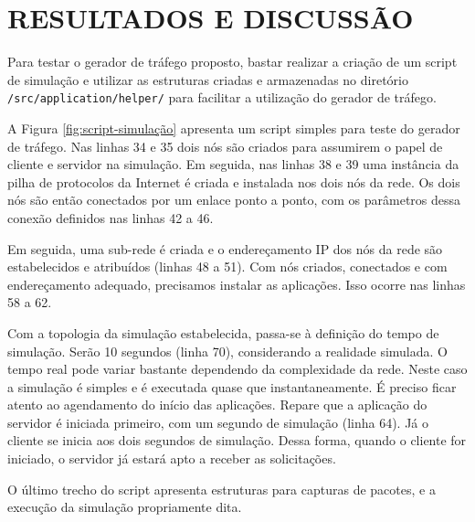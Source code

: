 \section{RESULTADOS E DISCUSSÃO}
Para testar o gerador de tráfego proposto, bastar realizar a criação de um script de simulação e utilizar as estruturas criadas e armazenadas no diretório \verb|/src/application/helper/| para facilitar a utilização do gerador de tráfego.

A Figura \ref{fig:script-simulação} apresenta um script simples para teste do gerador de tráfego. Nas linhas 34 e 35 dois nós são criados para assumirem o papel de cliente e servidor na simulação. Em seguida, nas linhas 38 e 39 uma instância da pilha de protocolos da Internet é criada e instalada nos dois nós da rede. Os dois nós são então conectados por um enlace ponto a ponto, com os parâmetros dessa conexão definidos nas linhas 42 a 46.

Em seguida, uma sub-rede é criada e o endereçamento IP dos nós da rede são estabelecidos e atribuídos (linhas 48 a 51). Com nós criados, conectados e com endereçamento adequado, precisamos instalar as aplicações. Isso ocorre nas linhas 58 a 62.

Com a topologia da simulação estabelecida, passa-se à definição do tempo de simulação. Serão 10 segundos (linha 70), considerando a realidade simulada. O tempo real pode variar bastante dependendo da complexidade da rede. Neste caso a simulação é simples e é executada quase que instantaneamente. É preciso ficar atento ao agendamento do início das aplicações. Repare que a aplicação do servidor é iniciada primeiro, com um segundo de simulação (linha 64). Já o cliente se inicia aos dois segundos de simulação. Dessa forma, quando o cliente for iniciado, o servidor já estará apto a receber as solicitações.

O último trecho do script apresenta estruturas para capturas de pacotes, e a execução da simulação propriamente dita.

